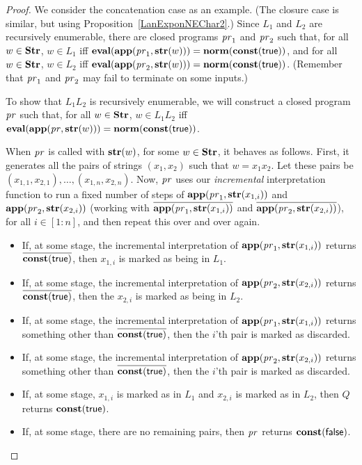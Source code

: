 \begin{proof}
We consider the concatenation case as an example.  (The closure case
is similar, but using Proposition~\ref{LanExponNEChar2}.)  Since $L_1$
and $L_2$ are recursively enumerable, there are closed programs
$\mathit{pr}_1$ and $\mathit{pr}_2$ such that, for all $w\in\mathbf{Str}$, $w\in L_1$ iff
$\mathbf{eval}(\mathbf{app}(\mathit{pr}_1,\mathbf{str}(w)))=\mathbf{norm}(\mathbf{const}(\mathsf{true}))$, and
for all $w\in\mathbf{Str}$, $w\in L_2$ iff
$\mathbf{eval}(\mathbf{app}(\mathit{pr}_2,\mathbf{str}(w)))=\mathbf{norm}(\mathbf{const}(\mathsf{true}))$.
(Remember that $\mathit{pr}_1$ and $\mathit{pr}_2$ may fail to terminate on some
inputs.)

To show that $L_1L_2$ is recursively enumerable, we will construct a
closed program $\mathit{pr}$ such that, for all $w\in\mathbf{Str}$, $w\in L_1L_2$ iff
$\mathbf{eval}(\mathbf{app}(\mathit{pr},\mathbf{str}(w)))=\mathbf{norm}(\mathbf{const}(\mathsf{true}))$.

When $\mathit{pr}$ is called with $\mathbf{str}(w)$, for some $w\in\mathbf{Str}$, it
behaves as follows.  First, it generates all the pairs of strings
$(x_1,x_2)$ such that $w=x_1x_2$.  Let these pairs be
$(x_{1,1},x_{2,1}),\ldots,(x_{1,n},x_{2,n})$.  Now, $\mathit{pr}$ uses our
\emph{incremental} interpretation function to run a fixed number of
steps of $\mathbf{app}(\mathit{pr}_1,\mathbf{str}(x_{1,i}))$ and
$\mathbf{app}(\mathit{pr}_2,\mathbf{str}(x_{2,i}))$ (working with
$\overline{\mathbf{app}(\mathit{pr}_1,\mathbf{str}(x_{1,i}))}$ and
$\overline{\mathbf{app}(\mathit{pr}_2,\mathbf{str}(x_{2,i}))}$), for all $i\in[1:n]$,
and then repeat this over and over again.

\begin{itemize}
\item If, at some stage, the incremental interpretation of
  $\mathbf{app}(\mathit{pr}_1,\mathbf{str}(x_{1,i}))$ returns
  $\overline{\mathbf{const}(\mathsf{true})}$, then $x_{1,i}$ is marked as being in
  $L_1$.

\item If, at some stage, the incremental interpretation of
  $\mathbf{app}(\mathit{pr}_2,\mathbf{str}(x_{2,i}))$ returns
  $\overline{\mathbf{const}(\mathsf{true})}$, then the $x_{2,i}$ is marked as
  being in $L_2$.

\item If, at some stage, the incremental interpretation of
  $\mathbf{app}(\mathit{pr}_1,\mathbf{str}(x_{1,i}))$ returns something other than
  $\overline{\mathbf{const}(\mathsf{true})}$, then the $i$'th pair is marked as
  discarded.

\item If, at some stage, the incremental interpretation of
  $\mathbf{app}(\mathit{pr}_2,\mathbf{str}(x_{2,i}))$ returns something other than
  $\overline{\mathbf{const}(\mathsf{true})}$, then the $i$'th pair is marked as
  discarded.

\item If, at some stage, $x_{1,i}$ is marked as in $L_1$ and $x_{2,i}$
  is marked as in $L_2$, then $Q$ returns $\mathbf{const}(\mathsf{true})$.

\item If, at some stage, there are no remaining pairs, then $\mathit{pr}$
  returns $\mathbf{const}(\mathsf{false})$.
\end{itemize}
\end{proof}

